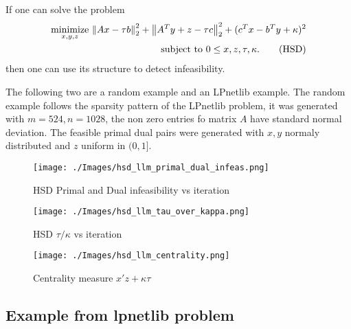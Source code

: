 \documentclass[smallextended]{article}       %
\begin{document}
If one can solve the problem
\begin{align}
  \underset{x,y,z}{\operatorname{minimize}}\ {\left\| Ax-\tau b \right\|_2^2+\left\| A^Ty+z-\tau c \right\|_2^2+(c^Tx-b^Ty+\kappa)^2}\\
  \text{ subject to } 0\leq x,z,\tau,\kappa.
  \label{eq:hsd}
  \tag{HSD}
\end{align}
then one can use its structure to detect infeasibility. 

The following two are a random example and an LPnetlib example. 
The random example follows the sparsity pattern of the LPnetlib problem,
it was generated with 
$m=524,n=1028$, the non zero entries fo matrix $A$ have standard normal deviation. The
feasible primal dual pairs were generated with $x,y$ normaly distributed
and $z$ uniform in $(0,1]$.

\begin{comment}
The following are generated from the tfocs_homogeneous_test.m script
\end{comment}


\begin{figure}[h]
  \begin{center}
    \texttt{[image: ./Images/hsd\_llm\_primal\_dual\_infeas.png]}
  \end{center}
  \caption{HSD Primal and Dual infeasibility vs iteration}
  \label{fig:hsd_pd_infeas}
\end{figure}

\begin{figure}[h]
  \begin{center}
    \texttt{[image: ./Images/hsd\_llm\_tau\_over\_kappa.png]}
  \end{center}
  \caption{HSD $\tau/\kappa$ vs iteration}
  \label{fig:hsd_tau_kappa}
\end{figure}

\begin{figure}[h]
  \begin{center}
    \texttt{[image: ./Images/hsd\_llm\_centrality.png]}
  \end{center}
  \caption{Centrality measure $x'z+\kappa\tau$}
  \label{fig:hsd_centrality}
\end{figure}

\subsection{Example from lpnetlib problem }

\begin{comment}
The following are generated by the 
tfocs_homogeneous_compare_rand_lpnetlib.m scripts
\end{comment}
\end{document}
